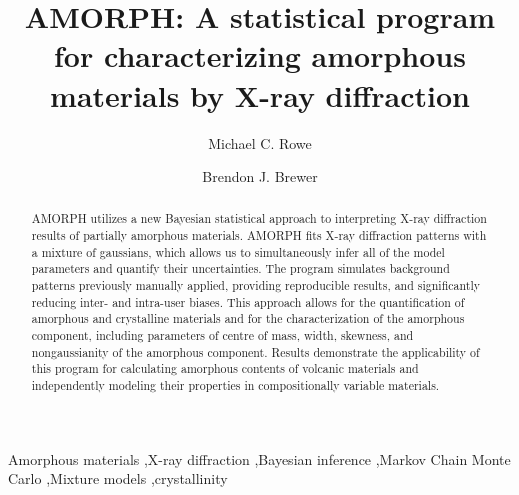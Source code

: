\documentclass[preprint, a4paper]{elsarticle}
\begin{document}
\begin{frontmatter}

\title{AMORPH: A statistical program for characterizing amorphous materials by X-ray diffraction}

\author[rowe]{Michael C. Rowe}
\address[rowe]{School of Environment, The University of Auckland, Private Bag 92019, Auckland 1142, New Zealand}

\author[brewer]{Brendon J. Brewer}
\address[brewer]{Department of Statistics, The University of Auckland, Private Bag 92019, Auckland 1142, New Zealand}

\begin{abstract}
AMORPH utilizes a new Bayesian statistical approach to interpreting X-ray diffraction results of partially amorphous materials. AMORPH fits X-ray diffraction patterns with a mixture of gaussians,
which allows us to simultaneously infer all of the model parameters and quantify their
uncertainties.
The program simulates background patterns previously manually applied, providing reproducible results, and significantly reducing inter- and intra-user biases. This approach allows for the quantification of amorphous and crystalline materials and for the characterization of the amorphous component, including parameters of centre of mass, width, skewness, and nongaussianity of the amorphous component. Results demonstrate the applicability of this program for calculating amorphous contents of volcanic materials and independently modeling their properties in compositionally variable materials.
\end{abstract}

\begin{keyword}
  Amorphous materials \sep X-ray diffraction \sep Bayesian inference \sep Markov Chain Monte Carlo \sep Mixture models \sep crystallinity
\end{keyword}

\end{frontmatter}

\end{document}
